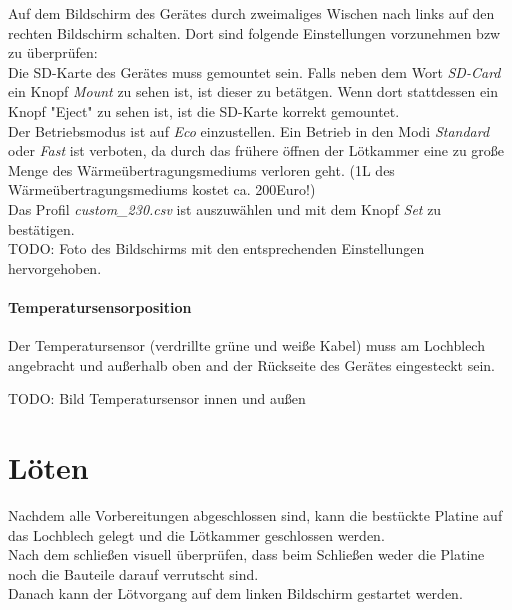 \documentclass{\basedir/fablab-document}
\begin{document}
Auf dem Bildschirm des Ger{\"a}tes durch zweimaliges Wischen nach links auf den rechten Bildschirm schalten. Dort sind folgende Einstellungen vorzunehmen bzw zu {\"u}berpr{\"u}fen:\\

Die SD-Karte des Ger{\"a}tes muss gemountet sein. Falls neben dem Wort \textit{SD-Card} ein Knopf \textit{Mount} zu sehen ist, ist dieser zu bet{\"a}tgen. Wenn dort stattdessen ein Knopf "Eject" zu sehen ist, ist die SD-Karte korrekt gemountet.\\

Der Betriebsmodus ist auf \textit{Eco} einzustellen. Ein Betrieb in den Modi \textit{Standard} oder \textit{Fast} ist verboten, da durch das fr{\"u}here {\"o}ffnen der L{\"o}tkammer eine zu gro{\ss}e Menge des W{\"a}rme{\"u}bertragungsmediums verloren geht. (1L des W{\"a}rme{\"u}bertragungsmediums kostet ca. 200Euro!)\\

Das Profil \textit{custom\_230.csv} ist auszuw{\"a}hlen und mit dem Knopf \textit{Set} zu best{\"a}tigen.\\

TODO: Foto des Bildschirms mit den entsprechenden Einstellungen hervorgehoben.

\paragraph{Temperatursensorposition}

Der Temperatursensor (verdrillte gr{\"u}ne und wei{\ss}e Kabel) muss am Lochblech angebracht und au{\ss}erhalb oben and der R{\"u}ckseite des Ger{\"a}tes eingesteckt sein.

TODO: Bild Temperatursensor innen und au{\ss}en

\section{L{\"o}ten}

Nachdem alle Vorbereitungen abgeschlossen sind, kann die best{\"u}ckte Platine auf das Lochblech gelegt und die L{\"o}tkammer geschlossen werden.\\

Nach dem schlie{\ss}en visuell {\"u}berpr{\"u}fen, dass beim Schlie{\ss}en weder die Platine noch die Bauteile darauf verrutscht sind.\\

Danach kann der L{\"o}tvorgang auf dem linken Bildschirm gestartet werden.\\
\end{document}
